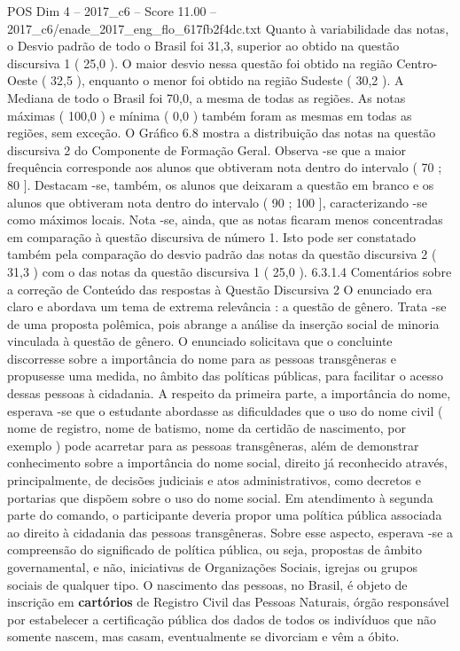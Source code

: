 \begin{textsample}{POS Dim 4 – 2017\_c6 – Score 11.00 – 2017\_c6/enade\_2017\_eng\_flo\_617fb2f4dc.txt}
Quanto à variabilidade das notas, o Desvio padrão de todo o Brasil foi 31,3, superior ao obtido na questão discursiva 1 ( 25,0 ).
O maior desvio nessa questão foi obtido na região Centro-Oeste ( 32,5 ), enquanto o menor foi obtido na região Sudeste ( 30,2 ).
A Mediana de todo o Brasil foi 70,0, a mesma de todas as regiões.
As notas máximas ( 100,0 ) e mínima ( 0,0 ) também foram as mesmas em todas as regiões, sem exceção.
O Gráfico 6.8 mostra a distribuição das notas na questão discursiva 2 do Componente de Formação Geral.
Observa -se que a maior frequência corresponde aos alunos que obtiveram nota dentro do intervalo ( 70 ; 80 ].
Destacam -se, também, os alunos que deixaram a questão em branco e os alunos que obtiveram nota dentro do intervalo ( 90 ; 100 ], caracterizando -se como máximos locais.
Nota -se, ainda, que as notas ficaram menos concentradas em comparação à questão discursiva de número 1.
Isto pode ser constatado também pela comparação do desvio padrão das notas da questão discursiva 2 ( 31,3 ) com o das notas da questão discursiva 1 ( 25,0 ). 6.3.1.4 Comentários sobre a correção de Conteúdo das respostas à Questão Discursiva 2 O enunciado era claro e abordava um tema de extrema relevância : a questão de gênero.
Trata -se de uma proposta polêmica, pois abrange a análise da inserção social de minoria vinculada à questão de gênero.
O enunciado solicitava que o concluinte discorresse sobre a importância do nome para as pessoas transgêneras e propusesse uma medida, no âmbito das políticas públicas, para facilitar o acesso dessas pessoas à cidadania.
A respeito da primeira parte, a importância do nome, esperava -se que o estudante abordasse as dificuldades que o uso do nome civil ( nome de registro, nome de batismo, nome da certidão de nascimento, por exemplo ) pode acarretar para as pessoas transgêneras, além de demonstrar conhecimento sobre a importância do nome social, direito já reconhecido através, principalmente, de decisões judiciais e atos administrativos, como decretos e portarias que dispõem sobre o uso do nome social.
Em atendimento à segunda parte do comando, o participante deveria propor uma política pública associada ao direito à cidadania das pessoas transgêneras.
Sobre esse aspecto, esperava -se a compreensão do significado de política pública, ou seja, propostas de âmbito governamental, e não, iniciativas de Organizações Sociais, igrejas ou grupos sociais de qualquer tipo.
O nascimento das pessoas, no Brasil, é objeto de inscrição em \textbf{cartórios} de Registro Civil das Pessoas Naturais, órgão responsável por estabelecer a certificação pública dos dados de todos os indivíduos que não somente nascem, mas casam, eventualmente se divorciam e vêm a óbito.

\end{textsample}
